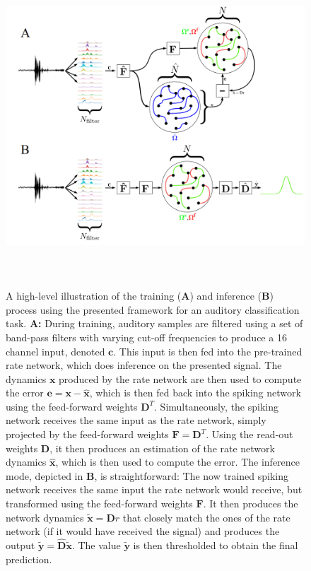 \documentclass[twoside,11pt,titlepage]{article}
\begin{document}
\newpage

\begin{figure}[!htb]
  \includegraphics[width = \columnwidth, height=12cm]{figures/setup_complete.png}
  \caption{A high-level illustration of the training (\textbf{A}) and inference (\textbf{B}) process using the presented framework for an auditory classification task.
  \textbf{A:} During training, auditory samples are filtered using a set of band-pass filters with varying cut-off frequencies to produce a
  16 channel input, denoted $\mathbf{c}$. This input is then fed into the pre-trained rate network, which does inference on the presented signal. The dynamics
  $\mathbf{x}$ produced by the rate network are then used to compute the error $\mathbf{e} = \mathbf{x} - \hat{\mathbf{x}}$, which is then fed back into
  the spiking network using the feed-forward weights $\mathbf{D}^T$. Simultaneously, the spiking network receives the same input as the rate network, simply projected by the feed-forward
  weights $\mathbf{F} = \mathbf{D}^T$. Using the read-out weights $\mathbf{D}$, it then produces an estimation of the rate network dynamics $\hat{\mathbf{x}}$, which is then used to compute the
  error. \newline
  The inference mode, depicted in \textbf{B}, is straightforward: The now trained spiking network receives the same input the rate network would receive, but transformed using the
  feed-forward weights $\mathbf{F}$. It then produces the network dynamics $\tilde{\mathbf{x}} = \mathbf{D}r$ that closely match the ones of the rate network (if it would have received the signal)
  and produces the output $\tilde{\mathbf{y}} = \hat{\mathbf{D}}\tilde{\mathbf{x}}$. The value $\tilde{\mathbf{y}}$ is then thresholded to obtain the final prediction.}
  \label{fig:figure1}
\end{figure}
\end{document}
